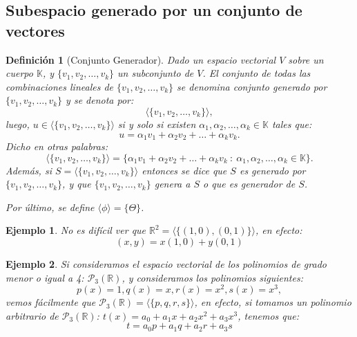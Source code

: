 \documentclass[12pt]{book}
\newtheorem{defi}{Definici\'on}
\newtheorem{ejem}{Ejemplo}
\def\R{\mathbb{R}}
\def\K{\mathbb{K}}
\def\P{\mathcal{P}}
\begin{document}
\subsection{Subespacio generado por un conjunto de vectores}

\begin{defi}[Conjunto Generador] Dado un espacio vectorial $V$ sobre un cuerpo $\K$, y $\{v_1,v_2,\dots,v_k\}$ un subconjunto de $V$. El conjunto de todas las combinaciones lineales de $\{v_1,v_2,\dots,v_k\}$ se denomina {\em conjunto generado} por $\{v_1,v_2,\dots,v_k\}$ y se denota por:
$$\langle\{v_1,v_2,\dots,v_k\}\rangle,$$
luego, $u\in\langle\{v_1,v_2,\dots,v_k\}\rangle$ si y solo si existen $\alpha_1,\alpha_2,\dots,\alpha_k\in\K$ tales que:
$$u=\alpha_1v_1+\alpha_2v_2+\dots+\alpha_kv_k.$$
Dicho en otras palabras:
$$\langle\{v_1,v_2,\dots,v_k\}\rangle=\{\alpha_1v_1+\alpha_2v_2+\dots+\alpha_kv_k\ :\  \alpha_1,\alpha_2,\dots,\alpha_k\in\K\}.$$
Adem\'as, si $S=\langle\{v_1,v_2,\dots,v_k\}\rangle$ entonces se dice que $S$ {\em es generado por} $\{v_1,v_2,\dots,v_k\}$, y que $\{v_1,v_2,\dots,v_k\}$ \emph{genera a} $S$ o que \emph{es generador de} $S$.

Por \'ultimo, se define $\langle \phi\rangle=\{\Theta\}$.
\end{defi}


\begin{ejem} {\em No es difícil ver que $\R^2=\langle\{(1,0),(0,1)\}\rangle$, en efecto:
$$ (x,y)=x(1,0)+y(0,1)$$
}  
\end{ejem}

\vspace{0.2 cm}

\begin{ejem}{\em
Si consideramos el espacio vectorial de los polinomios de grado menor o igual a 4: $\mathcal{P}_3(\R)$, y consideramos los polinomios siguientes:
$$p(x)=1, q(x)=x, r(x)=x^2, s(x)=x^3,$$ vemos fácilmente que $\mathcal{P}_3(\R)=\langle\{p,q,r,s\}\rangle$, en efecto, si tomamos un polinomio arbitrario de $\mathcal{P}_3(\R)$: $t(x)=a_0+a_1x+a_2x^2+a_3x^3$, tenemos que:
$$t=a_0p+a_1q+a_2r+a_3s$$
%
%
%
%
}  
\end{ejem}
\end{document}
